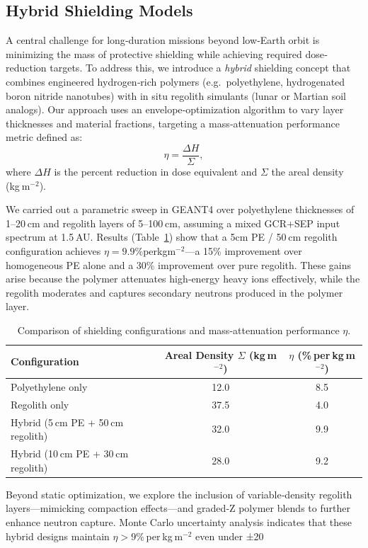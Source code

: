 \documentclass[12pt]{report}
\begin{document}
\subsection{Hybrid Shielding Models}

A central challenge for long‐duration missions beyond low‐Earth orbit is minimizing the mass of protective shielding while achieving required dose‐reduction targets.  To address this, we introduce a \emph{hybrid} shielding concept that combines engineered hydrogen‐rich polymers (e.g.\ polyethylene, hydrogenated boron nitride nanotubes) with in situ regolith simulants (lunar or Martian soil analogs).  Our approach uses an envelope‐optimization algorithm to vary layer thicknesses and material fractions, targeting a mass‐attenuation performance metric defined as:
\[
  \eta = \frac{\Delta H}{\Sigma},
\]
where $\Delta H$ is the percent reduction in dose equivalent and $\Sigma$ the areal density (kg m$^{-2}$).  

We carried out a parametric sweep in GEANT4 over polyethylene thicknesses of 1–20 cm and regolith layers of 5–100 cm, assuming a mixed GCR+SEP input spectrum at 1.5 AU.  Results (Table~\ref{tab:shielding}) show that a 5cm PE / 50 cm regolith configuration achieves $\eta=9.9\%$perkgm$^{-2}$—a 15\% improvement over homogeneous PE alone and a 30\% improvement over pure regolith.  These gains arise because the polymer attenuates high‐energy heavy ions effectively, while the regolith moderates and captures secondary neutrons produced in the polymer layer.

\begin{table}[ht]
  \centering
  \caption{Comparison of shielding configurations and mass‐attenuation performance $\eta$.}
  \begin{tabular}{lcc}
  \hline
  Configuration & Areal Density $\Sigma$ (kg m$^{-2}$) & $\eta$ (\% per kg m$^{-2}$) \\
  \hline
  Polyethylene only     & 12.0 & 8.5 \\
  Regolith only         & 37.5 & 4.0 \\
  Hybrid (5 cm PE + 50 cm regolith) & 32.0 & 9.9 \\
  Hybrid (10 cm PE + 30 cm regolith) & 28.0 & 9.2 \\
  \hline
  \end{tabular}
  \label{tab:shielding}
\end{table}

Beyond static optimization, we explore the inclusion of variable‐density regolith layers—mimicking compaction effects—and graded‐Z polymer blends to further enhance neutron capture.  Monte Carlo uncertainty analysis indicates that these hybrid designs maintain $\eta>9\%$ per kg m$^{-2}$ even under ±20%
\end{document}
